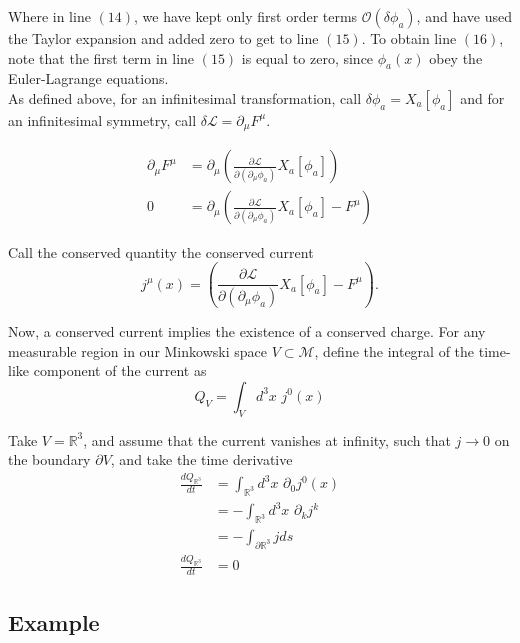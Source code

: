 \noindent Where in line $(14)$, we have kept only first order terms $\mathcal{O} (\delta \phi_a)$, and have used the Taylor expansion and added zero to get to line $(15)$. To obtain line $(16)$, note that the first term in line $(15)$ is equal to zero, since $\phi_a(x)$ obey the Euler-Lagrange equations. \\

\noindent As defined above, for an infinitesimal transformation, call $\delta \phi_a = X_a[\phi_a]$  and  for an infinitesimal symmetry, call $\delta \mathscr{L} = \partial_\mu F^\mu$.

\begin{align}
\partial_\mu F^\mu &= \partial_\mu \left( \frac{\partial \mathscr{L}}{\partial (\partial_\mu \phi_a)} X_a[\phi_a] \right) \\
0 &= \partial_\mu \left( \frac{\partial \mathscr{L}}{\partial (\partial_\mu \phi_a)} X_a[\phi_a] - F^\mu \right)
\end{align}

\noindent Call the conserved quantity the conserved current 
\begin{equation}
j^\mu (x) = \left( \frac{\partial \mathscr{L}}{\partial (\partial_\mu \phi_a)} X_a[\phi_a] - F^\mu \right).
\end{equation}

\noindent Now, a conserved current implies the existence of a conserved charge. For any measurable region in our Minkowski space $V \subset \mathcal{M}$, define the integral of the time-like component of the current as
\begin{equation}
Q_V = \int_V d^3 x \,\, j^0(x)
\end{equation}

\noindent Take $V=\mathbb{R}^3$, and assume that the current vanishes at infinity, such that $j \rightarrow 0$ on the boundary $\partial V$, and take the time derivative
\begin{align}
\frac{d Q_{\mathbb{R}^3}}{d t} &= \int_{\mathbb{R}^3} d^3x \,\, \partial_0 j^0 (x) \\
&= - \int_{\mathbb{R}^3} d^3x \,\, \partial_k j^k \\
&= - \int_{\partial \mathbb{R}^3} j  ds \\
\frac{d Q_{\mathbb{R}^3}}{d t} &= 0
\end{align}

\subsection*{Example}

